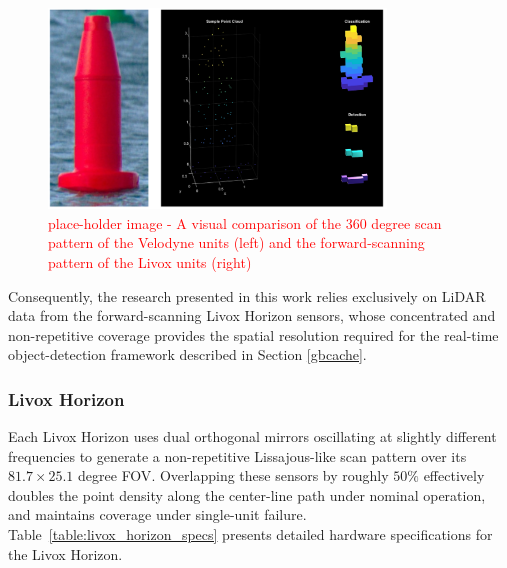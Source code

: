\documentclass{erauthesis}
\begin{document}
\begin{figure}[htbp]
\centering
\includegraphics[width=0.8\textwidth]{Images/LiDAR_compare.png}
\caption{\textcolor{red}{place-holder image - A visual comparison of the 360 degree scan pattern of the Velodyne units (left) and the forward-scanning pattern of the Livox units (right)} }
\label{fig:lidar_scan_compare}
\end{figure}


Consequently, the research presented in this work relies exclusively on LiDAR data from the forward-scanning Livox Horizon sensors, whose concentrated and non-repetitive coverage provides the spatial resolution required for the real-time object-detection framework described in Section \ref{gbcache}.
\subsubsection{Livox Horizon} \label{sensors_livox}

Each Livox Horizon uses dual orthogonal mirrors oscillating at slightly different frequencies to generate a non-repetitive Lissajous-like scan pattern over its $81.7 \times 25.1$ degree \ac{FOV}. 
Overlapping these sensors by roughly $50 \%$ effectively doubles the point density along the center-line path under nominal operation, and maintains coverage under single-unit failure.
Table~\ref{table:livox_horizon_specs} presents detailed hardware specifications for the Livox Horizon.
\end{document}
